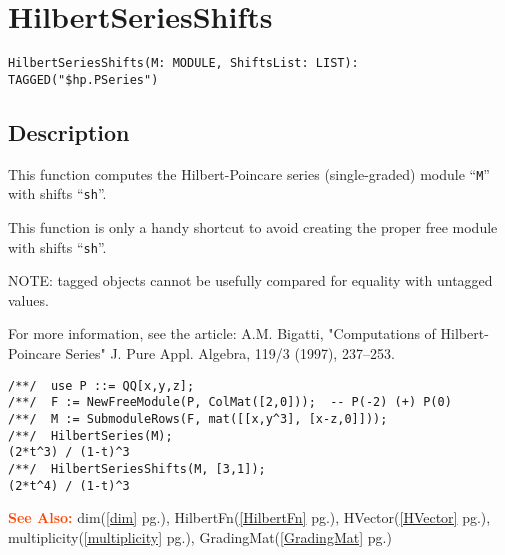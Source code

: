 \documentclass[a4paper]{mybook}
\newenvironment{command}{}{} %
\newcommand\SeeAlso{\par\textcolor{OrangeRed}{\textbf{\large See Also: }}}
\begin{document}
\section{HilbertSeriesShifts}
\label{HilbertSeriesShifts}
\begin{command} %


\begin{Verbatim}[label=syntax, rulecolor=\color{MidnightBlue},
frame=single]
HilbertSeriesShifts(M: MODULE, ShiftsList: LIST): TAGGED("$hp.PSeries")
\end{Verbatim}


\subsection*{Description}

This function computes the Hilbert-Poincare series
(single-graded) module ``\verb&M&'' with shifts ``\verb&sh&''.
\par 
This function is only a handy shortcut to avoid creating the proper
free module with shifts ``\verb&sh&''.
\par 
NOTE: tagged objects cannot be usefully compared for equality with
untagged values.
\par 
For more information, see the article: A.M. Bigatti, "Computations of
Hilbert-Poincare Series" J. Pure Appl. Algebra, 119/3 (1997),
237--253.
\begin{Verbatim}[label=example, rulecolor=\color{PineGreen}, frame=single]
/**/  use P ::= QQ[x,y,z];
/**/  F := NewFreeModule(P, ColMat([2,0]));  -- P(-2) (+) P(0)
/**/  M := SubmoduleRows(F, mat([[x,y^3], [x-z,0]]));
/**/  HilbertSeries(M);
(2*t^3) / (1-t)^3
/**/  HilbertSeriesShifts(M, [3,1]);
(2*t^4) / (1-t)^3
\end{Verbatim}


\SeeAlso %
  dim(\ref{dim} pg.\pageref{dim}), 
    HilbertFn(\ref{HilbertFn} pg.\pageref{HilbertFn}), 
    HVector(\ref{HVector} pg.\pageref{HVector}), 
    multiplicity(\ref{multiplicity} pg.\pageref{multiplicity}), 
    GradingMat(\ref{GradingMat} pg.\pageref{GradingMat})
\end{command} %
\end{document}
